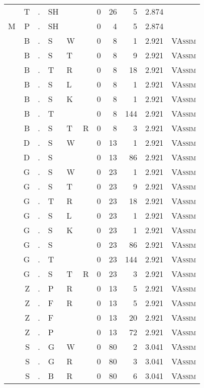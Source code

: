 \begin{longtable}{r@{ } r@{ } c@{ } l@{ } l@{ } l@{ } r r r r l }
  & T & . & SH &   &   & 0 & 26 & 5 & 2.874 &  \\
M & P & . & SH &   &   & 0 & 4 & 5 & 2.874 &  \\
  & B & . & S & W &   & 0 & 8 & 1 & 2.921 & \textsc{VAssim} \\
  & B & . & S & T &   & 0 & 8 & 9 & 2.921 & \textsc{VAssim} \\
  & B & . & T & R &   & 0 & 8 & 18 & 2.921 & \textsc{VAssim} \\
  & B & . & S & L &   & 0 & 8 & 1 & 2.921 & \textsc{VAssim} \\
  & B & . & S & K &   & 0 & 8 & 1 & 2.921 & \textsc{VAssim} \\
  & B & . & T &   &   & 0 & 8 & 144 & 2.921 & \textsc{VAssim} \\
  & B & . & S & T & R & 0 & 8 & 3 & 2.921 & \textsc{VAssim} \\
  & D & . & S & W &   & 0 & 13 & 1 & 2.921 & \textsc{VAssim} \\
  & D & . & S &   &   & 0 & 13 & 86 & 2.921 & \textsc{VAssim} \\
  & G & . & S & W &   & 0 & 23 & 1 & 2.921 & \textsc{VAssim} \\
  & G & . & S & T &   & 0 & 23 & 9 & 2.921 & \textsc{VAssim} \\
  & G & . & T & R &   & 0 & 23 & 18 & 2.921 & \textsc{VAssim} \\
  & G & . & S & L &   & 0 & 23 & 1 & 2.921 & \textsc{VAssim} \\
  & G & . & S & K &   & 0 & 23 & 1 & 2.921 & \textsc{VAssim} \\
  & G & . & S &   &   & 0 & 23 & 86 & 2.921 & \textsc{VAssim} \\
  & G & . & T &   &   & 0 & 23 & 144 & 2.921 & \textsc{VAssim} \\
  & G & . & S & T & R & 0 & 23 & 3 & 2.921 & \textsc{VAssim} \\
  & Z & . & P & R &   & 0 & 13 & 5 & 2.921 & \textsc{VAssim} \\
  & Z & . & F & R &   & 0 & 13 & 5 & 2.921 & \textsc{VAssim} \\
  & Z & . & F &   &   & 0 & 13 & 20 & 2.921 & \textsc{VAssim} \\
  & Z & . & P &   &   & 0 & 13 & 72 & 2.921 & \textsc{VAssim} \\
  & S & . & G & W &   & 0 & 80 & 2 & 3.041 & \textsc{VAssim} \\
  & S & . & G & R &   & 0 & 80 & 3 & 3.041 & \textsc{VAssim} \\
  & S & . & B & R &   & 0 & 80 & 6 & 3.041 & \textsc{VAssim} \\

\end{longtable}

